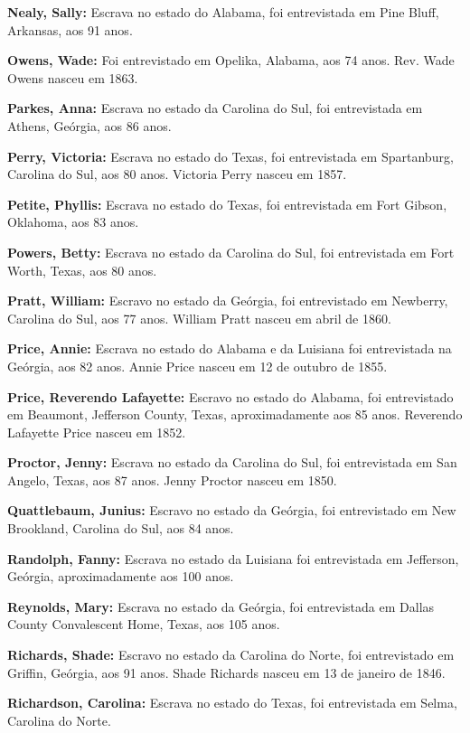 \textbf{Nealy, Sally:} Escrava no estado do Alabama, foi entrevistada em
Pine Bluff, Arkansas, aos 91 anos.

\textbf{Owens, Wade:} Foi entrevistado em Opelika, Alabama, aos 74 anos.
Rev. Wade Owens nasceu em 1863.

\textbf{Parkes, Anna:} Escrava no estado da Carolina do Sul, foi
entrevistada em Athens, Geórgia, aos 86 anos.

\textbf{Perry, Victoria:} Escrava no estado do Texas, foi entrevistada
em Spartanburg, Carolina do Sul, aos 80 anos. Victoria Perry nasceu em
1857.

\textbf{Petite, Phyllis:} Escrava no estado do Texas, foi entrevistada
em Fort Gibson, Oklahoma, aos 83 anos.

\textbf{Powers, Betty:} Escrava no estado da Carolina do Sul, foi
entrevistada em Fort Worth, Texas, aos 80 anos.

\textbf{Pratt, William:} Escravo no estado da Geórgia, foi entrevistado
em Newberry, Carolina do Sul, aos 77 anos. William Pratt nasceu em abril
de 1860.

\textbf{Price, Annie:} Escrava no estado do Alabama e da Luisiana foi
entrevistada na Geórgia, aos 82 anos. Annie Price nasceu em 12 de
outubro de 1855.

\textbf{Price, Reverendo Lafayette:} Escravo no estado do Alabama, foi
entrevistado em Beaumont, Jefferson County, Texas, aproximadamente aos
85 anos. Reverendo Lafayette Price nasceu em 1852.

\textbf{Proctor, Jenny:} Escrava no estado da Carolina do Sul, foi
entrevistada em San Angelo, Texas, aos 87 anos. Jenny Proctor nasceu em
1850.

\textbf{Quattlebaum, Junius:} Escravo no estado da Geórgia, foi
entrevistado em New Brookland, Carolina do Sul, aos 84 anos.

\textbf{Randolph, Fanny:} Escrava no estado da Luisiana foi entrevistada
em Jefferson, Geórgia, aproximadamente aos 100 anos.

\textbf{Reynolds, Mary:} Escrava no estado da Geórgia, foi entrevistada
em Dallas County Convalescent Home, Texas, aos 105 anos.

\textbf{Richards, Shade:} Escravo no estado da Carolina do Norte, foi
entrevistado em Griffin, Geórgia, aos 91 anos. Shade Richards nasceu em
13 de janeiro de 1846.

\textbf{Richardson, Carolina:} Escrava no estado do Texas, foi
entrevistada em Selma, Carolina do Norte.

